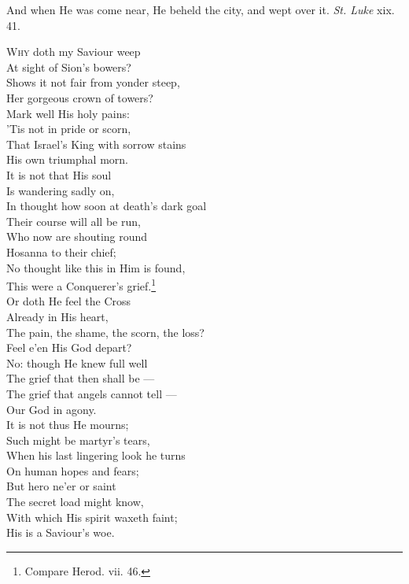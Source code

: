 
And when He was come near, He beheld the city, and wept over it. \emph{St. Luke} xix. 41.

\textsc{Why} doth my Saviour weep \\
 At sight of Sion’s bowers? \\
 Shows it not fair from yonder steep, \\
 Her gorgeous crown of towers? \\
 Mark well His holy pains: \\
 ’Tis not in pride or scorn, \\
 That Israel’s King with sorrow stains \\
 His own triumphal morn. \\
  It is not that His soul \\
 Is wandering sadly on, \\
 In thought how soon at death’s dark goal \\
 Their course will all be run, \\
 Who now are shouting round \\
 Hosanna to their chief; \\
 No thought like this in Him is found, \\
 This were a Conquerer’s grief.\footnote{Compare Herod. vii. 46.} \\
  Or doth He feel the Cross \\
 Already in His heart, \\
 The pain, the shame, the scorn, the loss? \\
 Feel e’en His God depart? \\
 No: though He knew full well \\
 The grief that then shall be — \\
 The grief that angels cannot tell — \\
 Our God in agony. \\
  It is not thus He mourns; \\
 Such might be martyr’s tears, \\
 When his last lingering look he turns \\
 On human hopes and fears; \\
 But hero ne’er or saint \\
 The secret load might know, \\
 With which His spirit waxeth faint; \\
 His is a Saviour’s woe. \\
